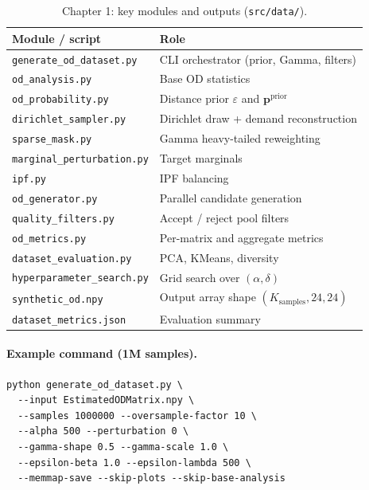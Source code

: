 \documentclass[11pt,a4paper]{report}
\newcommand{\mathbfp}{\mathbf{p}}
\begin{document}
\begin{table}[ht]
\centering
\caption{Chapter 1: key modules and outputs (\texttt{src/data/}).}
\label{tab:impl1}
\small
\begin{tabular}{@{}ll@{}}
\toprule
\textbf{Module / script} & \textbf{Role} \\
\midrule
\texttt{generate\_od\_dataset.py} & CLI orchestrator (prior, Gamma, filters) \\
\texttt{od\_analysis.py} & Base OD statistics \\
\texttt{od\_probability.py} & Distance prior $\varepsilon$ and $\mathbfp^{\mathrm{prior}}$ \\
\texttt{dirichlet\_sampler.py} & Dirichlet draw + demand reconstruction \\
\texttt{sparse\_mask.py} & Gamma heavy-tailed reweighting \\
\texttt{marginal\_perturbation.py} & Target marginals \\
\texttt{ipf.py} & IPF balancing \\
\texttt{od\_generator.py} & Parallel candidate generation \\
\texttt{quality\_filters.py} & Accept / reject pool filters \\
\texttt{od\_metrics.py} & Per-matrix and aggregate metrics \\
\texttt{dataset\_evaluation.py} & PCA, KMeans, diversity \\
\texttt{hyperparameter\_search.py} & Grid search over $(\alpha,\delta)$ \\
\midrule
\texttt{synthetic\_od.npy} & Output array shape $(K_{\mathrm{samples}},24,24)$ \\
\texttt{dataset\_metrics.json} & Evaluation summary \\
\bottomrule
\end{tabular}
\end{table}

\paragraph{Example command (1M samples).}
\begin{verbatim}
python generate_od_dataset.py \
  --input EstimatedODMatrix.npy \
  --samples 1000000 --oversample-factor 10 \
  --alpha 500 --perturbation 0 \
  --gamma-shape 0.5 --gamma-scale 1.0 \
  --epsilon-beta 1.0 --epsilon-lambda 500 \
  --memmap-save --skip-plots --skip-base-analysis
\end{verbatim}
\end{document}
